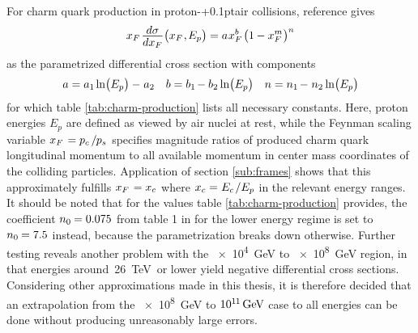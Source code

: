 For charm quark production in proton-{\kern+0.1pt}air collisions, reference \cite{Goncalves_2007} gives
\begin{equation*}
	x_F \kern+1.0pt \frac{\raisebox{-0.5ex}{$d\sigma$}}{\raisebox{0.5ex}{$dx_F$}} \bigl( x_F \kern+0.5pt, \kern-0.5pt E_p \bigr)
	\kern-0.1pt = a \kern+0.5pt x_F^b \kern+1.0pt \bigl( 1 \kern-0.3pt - x_F^m \kern+0.3pt \bigr)^n
\end{equation*}
as the parametrized differential cross section with components
\begin{align*}
	a = a_1 \kern-0.5pt \ln\bigl(E_p\bigr) - \kern+0.5pt a_2 && b = b_1 \kern-1.0pt - b_2 \ln\bigl(E_p\bigr) &&
	n = n_1 \kern-1.0pt - \kern+0.5pt n_2 \ln\bigl(E_p\bigr)
\end{align*}
for which table \ref{tab:charm-production} lists all necessary constants. Here, proton energies $E_p$ are defined as viewed
by air nuclei at rest, while the Feynman scaling variable $x_F \kern+1.0pt = p_c \kern+1.5pt / \kern-0.5pt p_s$ specifies
magnitude ratios of produced charm quark longitudinal momentum to all available momentum in center mass coordinates of the
colliding particles. Application of section \ref{sub:frames} shows that this approximately fulfills $x_F \kern+1.0pt = x_c$
where $\cramped{x_c = \kern+0.2pt E_c \kern+1.0pt / E_p}$ in the relevant energy ranges. It should be noted that for the values
table \ref{tab:charm-production} provides, the coefficient $n_0 \kern-0.5pt = \num{0.075}$ from table 1 in \cite{Goncalves_2007} 
for the lower energy regime is set to $n_0 \kern-0.5pt = \num{7.5}$ instead, because the parametrization breaks down otherwise.
Further testing reveals another problem with the \qty{e4}{\giga\electronvolt} to \qty{e8}{\giga\electronvolt} region,
in that energies around~\qty{26}{\tera\electronvolt}~or lower yield negative differential cross
sections. Considering other approximations made in this thesis, it is therefore decided that an extrapolation from the
\qty{e8}{\giga\electronvolt} to $10^{1 \kern-0.3pt 1} \kern+1.5pt \unit{\giga\electronvolt}$ case to all energies
can be done without producing unreasonably large errors.



